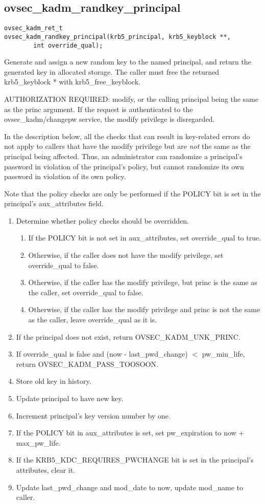 \subsection{ovsec_kadm_randkey_principal}

\begin{verbatim}
ovsec_kadm_ret_t
ovsec_kadm_randkey_principal(krb5_principal, krb5_keyblock **,
		int override_qual);
\end{verbatim}

Generate and assign a new random key to the named principal, and
return the generated key in allocated storage.  The caller must free
the returned krb5_keyblock * with krb5_free_keyblock.

AUTHORIZATION REQUIRED: modify, or the calling principal being the
same as the princ argument.  If the request is authenticated to the
ovsec_kadm/changepw service, the modify privilege is disregarded.

In the description below, all the checks that can result in
key-related errors do not apply to callers that have the modify
privilege but are {\it not} the same as the principal being affected.
Thus, an administrator can randomize a principal's password in
violation of the principal's policy, but cannot randomize its own
password in violation of its own policy.

Note that the policy checks are only be performed if the POLICY bit is
set in the principal's aux_attributes field.

\begin{enumerate}
\item Determine whether policy checks should be overridden.
\begin{enumerate}
\item If the POLICY bit is not set in aux_attributes, set
override_qual to true.
\item Otherwise, if the caller does not have the modify privilege,
set override_qual to false.
\item Otherwise, if the caller has the modify privilege, but princ is the
same as the caller, set override_qual to false.
\item Otherwise, if the caller has the modify privilege and princ is
not the same as the caller, leave override_qual as it is.
\end{enumerate}
\item If the principal does not exist, return OVSEC_KADM_UNK_PRINC.
\item If override_qual is false and (now - last_pwd_change) $<$
pw_min_life, return OVSEC_KADM_PASS_TOOSOON.
\item Store old key in history.
\item Update principal to have new key.
\item Increment principal's key version number by one.
\item If the POLICY bit in aux_attributes is set, set pw_expiration to
now + max_pw_life.
\item If the KRB5_KDC_REQUIRES_PWCHANGE bit is set in the principal's
attributes, clear it.
\item Update last_pwd_change and mod_date to now, update mod_name to
caller.
\end{enumerate}

